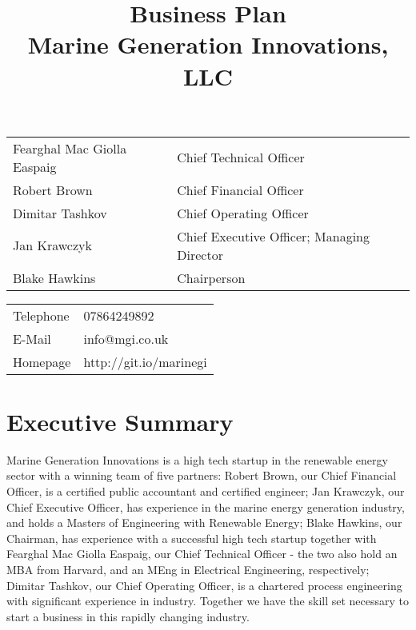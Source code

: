 \documentclass[a4paper,11pt]{article}
\title{Business Plan\\Marine Generation Innovations, LLC}
\begin{document}
\begin{titlepage}
    \centering
    \maketitle
    \thispagestyle{empty}   %
    \vfill
\begin{tabular}{l l}
    Fearghal Mac Giolla Easpaig & Chief Technical Officer \\
    Robert Brown & Chief Financial Officer \\
    Dimitar Tashkov & Chief Operating Officer \\
    Jan Krawczyk & Chief Executive Officer; Managing Director \\
    Blake Hawkins & Chairperson \\
\end{tabular}

\vspace{1cm}

\begin{tabular}{l l}
    Telephone & 07864249892 \\
    E-Mail & info@mgi.co.uk \\
    Homepage & http://git.io/marinegi
\end{tabular}

\end{titlepage}
\pagebreak

\tableofcontents
\pagebreak

\section{Executive Summary}

Marine Generation Innovations is a high tech startup in the renewable energy sector with a winning team of five partners: Robert Brown, our Chief Financial Officer, is a certified public accountant and certified engineer; Jan Krawczyk, our Chief Executive Officer, has experience in the marine energy generation industry, and holds a Masters of Engineering with Renewable Energy; Blake Hawkins, our Chairman, has experience with a successful high tech startup together with Fearghal Mac Giolla Easpaig, our Chief Technical Officer - the two also hold an MBA from Harvard, and an MEng in Electrical Engineering, respectively; Dimitar Tashkov, our Chief Operating Officer, is a chartered process engineering with significant experience in industry. Together we have the skill set necessary to start a business in this rapidly changing industry.\\
\end{document}
